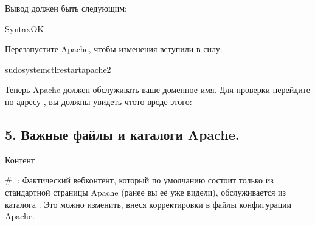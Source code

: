 \documentclass[letterpaper,10pt,russian]{sphinxmanual}
\begin{document}
\sphinxAtStartPar
Вывод должен быть следующим:

\begin{sphinxVerbatim}[commandchars=\\\{\}]
\PYGZdl{}SyntaxOK
\end{sphinxVerbatim}

\sphinxAtStartPar
Перезапустите Apache, чтобы изменения вступили в силу:

\begin{sphinxVerbatim}[commandchars=\\\{\}]
\PYGZdl{}sudosystemctlrestartapache2
\end{sphinxVerbatim}

\sphinxAtStartPar
Теперь Apache должен обслуживать ваше доменное имя. Для проверки перейдите по адресу , вы должны увидеть что\sphinxhyphen{}то вроде этого:


\subsection{5. Важные файлы и каталоги Apache.}
\label{\detokenize{docs:id7}}
\sphinxAtStartPar
Контент

\sphinxAtStartPar
\#. : Фактический веб\sphinxhyphen{}контент, который по умолчанию состоит только из стандартной
страницы Apache (ранее вы её уже видели), обслуживается из каталога . Это можно изменить,
внеся корректировки в файлы конфигурации Apache.
\end{document}
